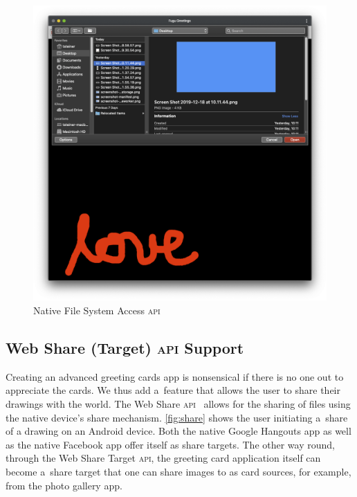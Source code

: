 \documentclass[sigconf]{acmart}
\begin{document}
\begin{figure}[b]
  \includegraphics[width=0.75\columnwidth]{file.png}
  \caption{Native File System Access \textsc{api}}
  \label{fig:file}
\end{figure}

\subsection{Web Share (Target) \textsc{api} Support}

Creating an advanced greeting cards app is nonsensical if there is no one out to appreciate the cards.
We thus add a~feature that allows the user to share their drawings with the world.
The Web Share \textsc{api}~\cite{giuca2017webshare} allows for the sharing of files
using the native device's share mechanism.
\autoref{fig:share} shows the user initiating a~share of a drawing on an Android device.
Both the native Google Hangouts app as well as the native Facebook app offer itself
as share targets.
The other way round, through the Web Share Target \textsc{api},
the greeting card application itself can become a~share target
that one can share images to as card sources, for example, from the photo gallery app.
\end{document}
